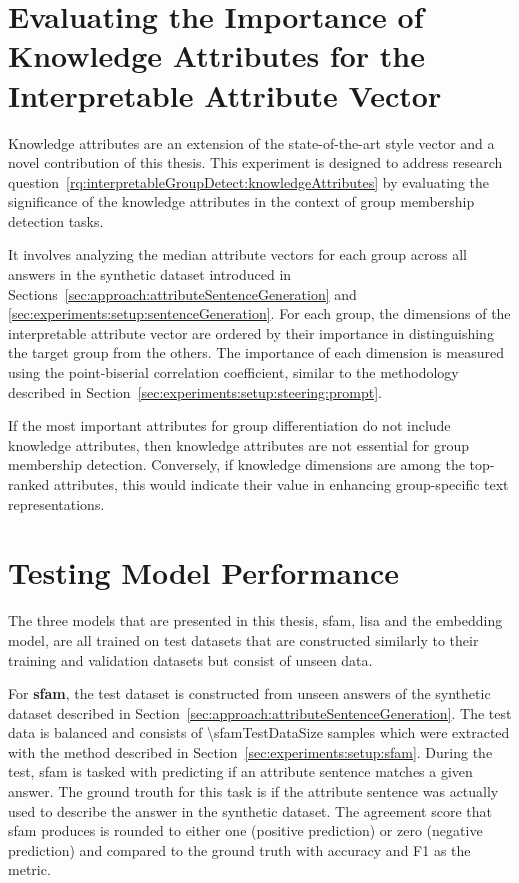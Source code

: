 \section{Evaluating the Importance of Knowledge Attributes for the Interpretable Attribute Vector}
Knowledge attributes are an extension of the state-of-the-art style vector and a novel contribution of this thesis. This experiment is designed to address research question~\ref{rq:interpretableGroupDetect:knowledgeAttributes} by evaluating the significance of the knowledge attributes in the context of group membership detection tasks.

It involves analyzing the median attribute vectors for each group across all answers in the synthetic dataset introduced in Sections~\ref{sec:approach:attributeSentenceGeneration} and \ref{sec:experiments:setup:sentenceGeneration}. For each group, the dimensions of the interpretable attribute vector are ordered by their importance in distinguishing the target group from the others. The importance of each dimension is measured using the point-biserial correlation coefficient, similar to the methodology described in Section~\ref{sec:experiments:setup:steering:prompt}.

If the most important attributes for group differentiation do not include knowledge attributes, then knowledge attributes are not essential for group membership detection. Conversely, if knowledge dimensions are among the top-ranked attributes, this would indicate their value in enhancing group-specific text representations.


\section{Testing Model Performance}
\label{sec:experiments:models}
The three models that are presented in this thesis, \ac{sfam}, \ac{lisa} and the embedding model, are all trained on test datasets that are constructed similarly to their training and validation datasets but consist of unseen data.

For \textbf{\ac{sfam}}, the test dataset is constructed from unseen answers of the synthetic dataset described in Section~\ref{sec:approach:attributeSentenceGeneration}. The test data is balanced and consists of \num{\sfamTestDataSize} samples which were extracted with the method described in Section~\ref{sec:experiments:setup:sfam}.
During the test, \ac{sfam} is tasked with predicting if an attribute sentence matches a given answer. The ground trouth for this task is if the attribute sentence was actually used to describe the answer in the synthetic dataset. The agreement score that \ac{sfam} produces is rounded to either one (positive prediction) or zero (negative prediction) and compared to the ground truth with accuracy and F1 as the metric.

